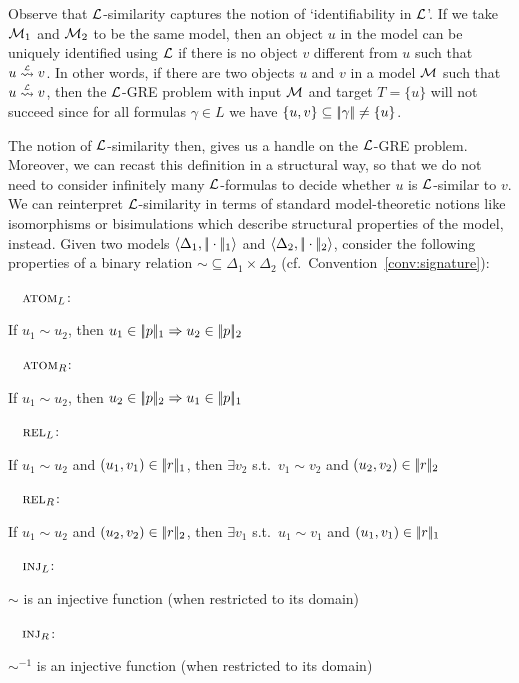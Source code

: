 Observe that $\mathcal{L}$-similarity captures the notion of
`identifiability in $\mathcal{L}$'. If we take $\mathcal{M}_1$ and $\mathcal{M}_2$ to be the
same model, then an object $u$ in the model can be uniquely
identified using $\mathcal{L}$ if there is no object $v$ different from $u$
such that $u \simil{\+L} v$. In other words, if there are two
objects $u$ and $v$  in a model $\mathcal{M}$ such that $u \simil{\+L} v$,
then the $\mathcal{L}$-GRE problem with input $\mathcal{M}$ and target $T=\{u\}$
will not succeed since for all formulas $\gamma \in L$ we have
$\{u,v\} \subseteq |\!|\gamma|\!| \not = \{u\}$.

The notion of $\mathcal{L}$-similarity then, gives us a handle on the
$\mathcal{L}$-GRE problem. Moreover, we can recast this definition in a
structural way, so that we do not need to consider infinitely many
$\mathcal{L}$-formulas to decide whether $u$ is $\mathcal{L}$-similar to $v$.  We
can reinterpret $\mathcal{L}$-similarity in terms of standard
model-theoretic notions like isomorphisms or bisimulations which
describe structural properties of the model, instead. Given two
models $\langle \Delta_1, |\!|\cdot|\!|_1\rangle$ and $\langle \Delta_2,
|\!|\cdot|\!|_2\rangle$, consider the following properties of a binary
relation ${\sim} \subseteq \Delta_1 \times \Delta_2$ (cf.~Convention~\ref{conv:signature}):
\smallskip



\newcommand{\simdef}[2]{\noindent\ \ #1\hfill:\ \parbox[t]{.87\textwidth}{#2}\par}

\simdef{$\textsc{atom}_L$}{If $u_1{\sim} u_2$, then $u_1 \in |\!|p|\!|_1 \Rightarrow u_2 \in |\!|p|\!|_2$}
\simdef{$\textsc{atom}_R$}{If $u_1{\sim} u_2$, then $u_2 \in |\!|p|\!|_2 \Rightarrow u_1 \in |\!|p|\!|_1$}
\simdef{$\textsc{rel}_L$}{If $u_1{\sim} u_2$ and $(u_1,v_1) \in |\!|r|\!|_1$, then $\exists v_2$ s.t.\ $v_1{\sim}v_2$
  and $(u_2,v_2) \in |\!|r|\!|_2$}
\simdef{$\textsc{rel}_R$}{If $u_1{\sim}u_2$ and $(u_2,v_2) \in |\!|r|\!|_2$, then $\exists v_1$ s.t.\ $u_1{\sim}v_1$ and
 $(u_1,v_1) \in |\!|r|\!|_1$}
\simdef{$\textsc{inj}_L\space$}{$\sim$ is an injective function (when restricted to its domain)}
\simdef{$\textsc{inj}_R\space$}{$\sim^{-1}$ is an injective function (when restricted to its domain)}
\smallskip


